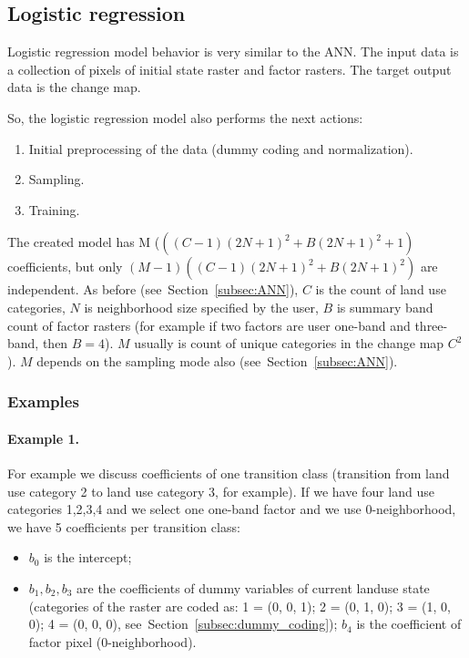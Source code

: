 \documentclass{report}
\begin{document}
\subsection{Logistic regression}\label{subsec:lr}
Logistic regression model behavior is very similar to the ANN. The input data is a collection of pixels of initial state raster and factor rasters. The target output data is the change map.

So, the logistic regression model also performs the next actions: 
\begin{enumerate}
    \item Initial preprocessing of the data (dummy coding and normalization).
    \item Sampling.
    \item Training.
\end{enumerate}

The created model has M ($((C-1)(2N+1)^{2}+B(2N+1)^{2}+1)$ coefficients, but only $(M-1)((C-1)(2N+1)^{2}+B(2N+1)^{2})$ are independent. As before (see~Section~\ref{subsec:ANN}), $C$ is the count of land use categories, $N$ is neighborhood size specified by the user, $B$ is summary band count of factor rasters (for example if two factors are user one-band and three-band, then $B=4$). $M$ usually is count of unique categories in the change map $C^{2}$). $M$ depends on the sampling mode also (see~Section~\ref{subsec:ANN}). 

\subsubsection{Examples}
\paragraph{Example 1.}
For example we discuss coefficients of one transition class (transition from land use category 2 to land use category 3, for example). If we have four land use categories 1,2,3,4 and we select one one-band factor and we use 0-neighborhood, we have 5 coefficients per transition class:
\begin{itemize}
    \item $b_{0}$ is the intercept;
    \item $b_{1},b_{2},b_{3}$ are the coefficients of dummy variables of current landuse state (categories of the raster are coded as: 1 = (0, 0, 1); 2 = (0, 1, 0); 3 = (1, 0, 0); 4 = (0, 0, 0), see~Section~\ref{subsec:dummy_coding});
      $b_{4}$ is the coefficient of factor pixel (0-neighborhood).
\end{itemize}
\end{document}
